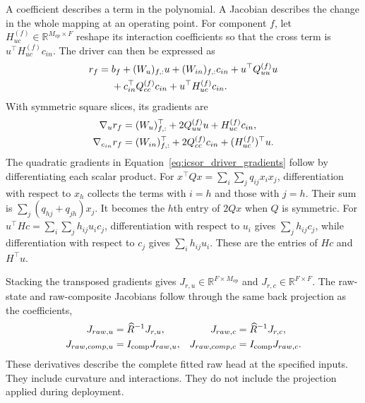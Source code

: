 A coefficient describes a term in the polynomial. A Jacobian describes the change in the whole mapping at an operating point. For component \(f\), let \(H_{uc}^{(f)}\in\mathbb{R}^{M_{op}\times F}\) reshape its interaction coefficients so that the cross term is \(u^\top H_{uc}^{(f)}c_{in}\). The driver can then be expressed as
\begin{equation}
\equationname{Component driver expressed through symmetric quadratic matrices}
\label{eq:icsor_driver_component}
\begin{aligned}
r_f={}&b_f+(W_u)_{f,:}u+(W_{in})_{f,:}c_{in}
+u^\top Q_{uu}^{(f)}u\\
&+c_{in}^\top Q_{cc}^{(f)}c_{in}
+u^\top H_{uc}^{(f)}c_{in}.
\end{aligned}
\end{equation}
With symmetric square slices, its gradients are
\begin{equation}
\equationname{Operating and influent gradients of a component driver}
\label{eq:icsor_driver_gradients}
\begin{aligned}
\nabla_u r_f&=(W_u)_{f,:}^\top+2Q_{uu}^{(f)}u
+H_{uc}^{(f)}c_{in},\\
\nabla_{c_{in}}r_f&=(W_{in})_{f,:}^\top+2Q_{cc}^{(f)}c_{in}
+(H_{uc}^{(f)})^\top u.
\end{aligned}
\end{equation}
The quadratic gradients in Equation~\eqref{eq:icsor_driver_gradients} follow by differentiating each scalar product. For \(x^\top Qx=\sum_i\sum_jq_{ij}x_ix_j\), differentiation with respect to \(x_h\) collects the terms with \(i=h\) and those with \(j=h\). Their sum is \(\sum_j(q_{hj}+q_{jh})x_j\). It becomes the \(h\)th entry of \(2Qx\) when \(Q\) is symmetric. For \(u^\top Hc=\sum_i\sum_jh_{ij}u_ic_j\), differentiation with respect to \(u_i\) gives \(\sum_jh_{ij}c_j\), while differentiation with respect to \(c_j\) gives \(\sum_i h_{ij}u_i\). These are the entries of \(Hc\) and \(H^\top u\).

Stacking the transposed gradients gives \(J_{r,u}\in\mathbb{R}^{F\times M_{op}}\) and \(J_{r,c}\in\mathbb{R}^{F\times F}\). The raw-state and raw-composite Jacobians follow through the same back projection as the coefficients,
\begin{equation}
\equationname{Raw component and composite Jacobians after coupling}
\label{eq:icsor_raw_jacobians}
\begin{aligned}
J_{raw,u}&=\widehat R^{-1}J_{r,u},
&J_{raw,c}&=\widehat R^{-1}J_{r,c},\\
J_{raw,comp,u}&=I_{\mathrm{comp}}J_{raw,u},
&J_{raw,comp,c}&=I_{\mathrm{comp}}J_{raw,c}.
\end{aligned}
\end{equation}
These derivatives describe the complete fitted raw head at the specified inputs. They include curvature and interactions. They do not include the projection applied during deployment.

